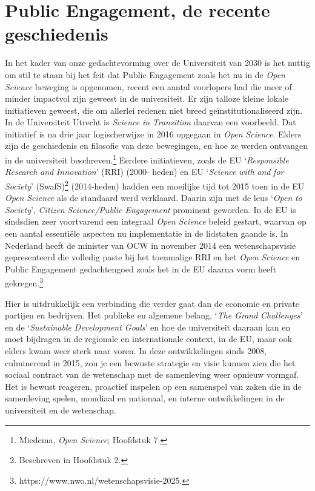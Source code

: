 \documentclass[smallauthor, chapterhaspagenum, nochapterinheader, pagenuminheader,  bigchapnum,medium2, tocpages,  garamond, titleinheader]{jote-book}
\begin{document}
	\section{Public Engagement, de recente geschiedenis}



	In het kader van onze gedachtevorming over de Universiteit van 2030 is het nuttig om stil te staan bij het feit dat Public Engagement zoals het nu in de \emph{Open }\emph{Science} beweging is opgenomen, recent een aantal voorlopers had die meer of minder impactvol zijn geweest in de universiteit. Er zijn talloze kleine lokale initiatieven geweest, die om allerlei redenen niet breed geïnstitutionaliseerd zijn. In de Universiteit Utrecht is \emph{Science}\emph{ in }\emph{Transition} daarvan een voorbeeld. Dat initiatief is na drie jaar logischerwijze in 2016 opgegaan in \emph{Open }\emph{Science}. Elders zijn de geschiedenis en filosofie van deze bewegingen, en hoe ze werden ontvangen in de universiteit beschreven.\footnote{Miedema, \emph{Open }\emph{Science}; Hoofdstuk 7. } Eerdere initiatieven, zoals de EU ‘\emph{Responsible}\emph{ Research }\emph{and}\emph{ }\emph{Innovation}' (RRI) (2000- heden) en EU ‘\emph{Science}\emph{ }\emph{with}\emph{ }\emph{and}\emph{ }\emph{for}\emph{ Society}' (SwafS)\footnote{Beschreven in Hoofdstuk 2.} (2014-heden) hadden een moeilijke tijd tot 2015 toen in de EU \emph{Open }\emph{Science} als de standaard werd verklaard. Daarin zijn met de leus ‘\emph{Open }\emph{to}\emph{ Society}', \emph{Citizen}\emph{ }\emph{Science}\emph{/Public Engagement} prominent geworden. In de EU is sindsdien zeer voortvarend een integraal \emph{Open }\emph{Science} beleid gestart, waarvan op een aantal essentiële aspecten nu implementatie in de lidstaten gaande is. In Nederland heeft de minister van OCW in november 2014 een wetenschapsvisie gepresenteerd die volledig paste bij het toenmalige RRI en het \emph{Open }\emph{Science} en Public Engagement gedachtengoed zoals het in de EU daarna vorm heeft gekregen.\footnote{https://www.nwo.nl/wetenschapsvisie-2025.}



	Hier is uitdrukkelijk een verbinding die verder gaat dan de economie en private partijen en bedrijven. Het publieke en algemene belang, ‘\emph{The Grand }\emph{Challenges}' en de ‘\emph{Sustainable}\emph{ Development Goals}' en hoe de universiteit daaraan kan en moet bijdragen in de regionale en internationale context, in de EU, maar ook elders kwam weer sterk naar voren. In deze ontwikkelingen sinds 2008, culminerend in 2015, zou je een bewuste strategie en visie kunnen zien die het sociaal contract van de wetenschap met de samenleving weer opnieuw vormgaf. Het is bewust reageren, proactief inspelen op een samenspel van zaken die in de samenleving spelen, mondiaal en nationaal, en interne ontwikkelingen in de universiteit en de wetenschap.
\end{document}
